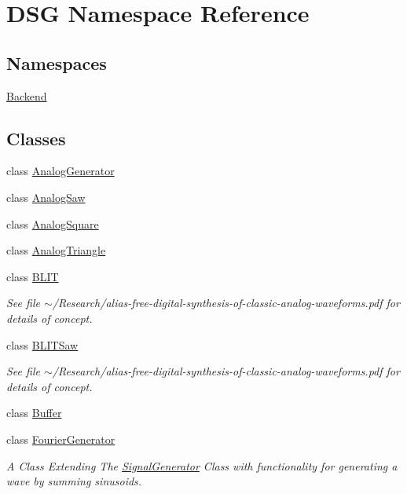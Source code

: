 \hypertarget{namespaceDSG}{\section{D\+S\+G Namespace Reference}
\label{namespaceDSG}
}
\subsection*{Namespaces}
\begin{DoxyCompactItemize}
\item 
 \hyperlink{namespaceDSG_1_1Backend}{Backend}
\end{DoxyCompactItemize}
\subsection*{Classes}
\begin{DoxyCompactItemize}
\item 
class \hyperlink{classDSG_1_1AnalogGenerator}{Analog\+Generator}
\item 
class \hyperlink{classDSG_1_1AnalogSaw}{Analog\+Saw}
\item 
class \hyperlink{classDSG_1_1AnalogSquare}{Analog\+Square}
\item 
class \hyperlink{classDSG_1_1AnalogTriangle}{Analog\+Triangle}
\item 
class \hyperlink{classDSG_1_1BLIT}{B\+L\+I\+T}
\begin{DoxyCompactList}\small\item\em See file $\sim$/\+Research/alias-\/free-\/digital-\/synthesis-\/of-\/classic-\/analog-\/waveforms.pdf for details of concept. \end{DoxyCompactList}\item 
class \hyperlink{classDSG_1_1BLITSaw}{B\+L\+I\+T\+Saw}
\begin{DoxyCompactList}\small\item\em See file $\sim$/\+Research/alias-\/free-\/digital-\/synthesis-\/of-\/classic-\/analog-\/waveforms.pdf for details of concept. \end{DoxyCompactList}\item 
class \hyperlink{classDSG_1_1Buffer}{Buffer}
\item 
class \hyperlink{classDSG_1_1FourierGenerator}{Fourier\+Generator}
\begin{DoxyCompactList}\small\item\em A Class Extending The \hyperlink{classDSG_1_1SignalGenerator}{Signal\+Generator} Class with functionality for generating a wave by summing sinusoids. \end{DoxyCompactList}\item 

\end{DoxyCompactItemize}
